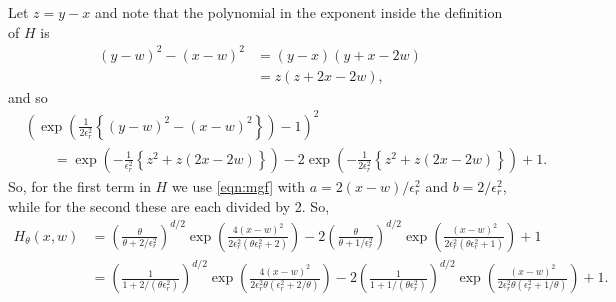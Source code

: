 \documentclass[12pt]{article}
\begin{document}
Let $z = y - x$ and note that the polynomial in the exponent inside the definition of $H$ is
\begin{align}
    (y-w)^2 - (x-w)^2
    &=
    (y - x)(y + x - 2w) \\
    &=
    z (z + 2x - 2w) ,
\end{align}
and so
\begin{align}
&
\left(
    \exp\left(
        \frac{1}{2\epsilon_r^2}
        \left\{
            (y - w)^2 - (x - w)^2
        \right\}
    \right)
    -
    1
\right)^2 \\
&\qquad
= \label{eqn:H_form}
    \exp\left(
        - \frac{1}{\epsilon_r^2}
        \left\{
            z^2 + z (2x - 2w)
        \right\}
    \right)
    - 2 \exp\left(
        - \frac{1}{2\epsilon_r^2}
        \left\{
            z^2 + z (2x - 2w)
        \right\}
    \right)
    + 1 .
\end{align}
So, for the first term in $H$ we use \eqref{eqn:mgf} with
$a = 2 (x-w) / \epsilon_r^2$ and $b = 2 / \epsilon_r^2$,
while for the second these are each divided by 2.
So,
\begin{align}
H_\theta(x, w)
&=
\left(
    \frac{ \theta }{ \theta + 2/\epsilon_r^2 }
\right)^{d/2}
\exp\left( \frac{ 4 (x-w)^2 }{ 2 \epsilon_r^2 (\theta \epsilon_r^2 + 2) } \right)
- 2
\left(
    \frac{ \theta }{ \theta + 1/\epsilon_r^2 }
\right)^{d/2}
\exp\left( \frac{ (x-w)^2 }{ 2 \epsilon_r^2 (\theta \epsilon_r^2 + 1) } \right)
+ 1 \\
&=
\left(
    \frac{ 1 }{ 1 + 2/(\theta \epsilon_r^2) }
\right)^{d/2}
\exp\left( \frac{ 4 (x-w)^2 }{ 2 \epsilon_r^2 \theta (\epsilon_r^2 + 2/\theta) } \right)
- 2
\left(
    \frac{ 1 }{ 1 + 1/(\theta \epsilon_r^2) }
\right)^{d/2}
\exp\left( \frac{ (x-w)^2 }{ 2 \epsilon_r^2 \theta (\epsilon_r^2 + 1/\theta) } \right)
+ 1 .
\end{align}
\end{document}
